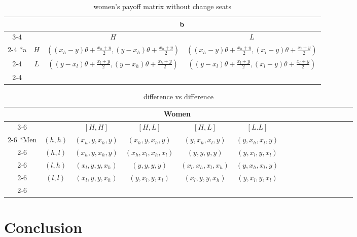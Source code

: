 \documentclass{article}
\begin{document}
	\begin{table}[h]
                \begin{center}
                \begingroup
                \renewcommand{\arraystretch}{1.8}
                \begin{tabular}{*{4}{c|}}
                  \multicolumn{2}{c}{} & \multicolumn{2}{c}{b}\\\cline{3-4}
                  \multicolumn{1}{c}{} &  & $H$  & $L$ \\\cline{2-4}
                  \multirow{2}*{a}  & $H$ & $((x_h - y)\theta + \frac{x_h+y}{2}, (y - x_h)\theta + \frac{x_h+y}{2})$ & $((x_h - y)\theta+\frac{x_h+y}{2}, (x_l - y)\theta + \frac{x_l+y}{2})$ \\\cline{2-4}
                  & $L$ & $((y-x_l)\theta + \frac{x_l+y}{2}, (y-x_h)\theta + \frac{x_h+y}{2})$ & $((y-x_l)\theta + \frac{x_l+y}{2}, (x_l - y)\theta + \frac{x_l+y}{2})$ \\\cline{2-4}
                \end{tabular}
                \endgroup
                \end{center}
                \caption{women's payoff matrix without change seats}
  	\end{table}
	
	\begin{table}[h]
	\begin{center}
                \setlength{\extrarowheight}{2pt}
                \begin{tabular}{*{16}{c|}}
                  \multicolumn{2}{c}{} & \multicolumn{1}{c}{} & \multicolumn{2}{c}{Women}\\\cline{3-6}
                  \multicolumn{1}{c}{} &  & $[H, H]$  & $[H, L]$ & $[H, L]$ & $[L.L]$\\\cline{2-6}
                  \multirow{4}*{Men}  & $(h,h)$ & $(x_h,y,x_h,y)$ & $(x_h,y,x_h,y)$ & $(y,x_h,x_l,y)$ & $(y,x_h,x_l,y)$\\\cline{2-6}
                  & $(h,l)$ & $(x_h,y,x_h,y)$ & $(x_h,x_l,x_h,x_l)$ & $(y,y,y,y)$ & $(y,x_l,y,x_l)$\\\cline{2-6}
                  & $(l,h)$ & $(x_l,y,y,x_h)$ & $(y,y,y,y)$ & $(x_l,x_h,x_l,x_h)$ & $(y,x_h,x_l,y)$\\\cline{2-6}
                  & $(l,l)$ & $(x_l,y,y,x_h)$ & $(y,x_l,y,x_l)$ & $(x_l,y,y,x_h)$ & $(y,x_l,y,x_l)$\\\cline{2-6}
                \end{tabular}
        \end{center}
        \caption{difference vs difference}
  	\end{table}




\section{Conclusion}
\end{document}

